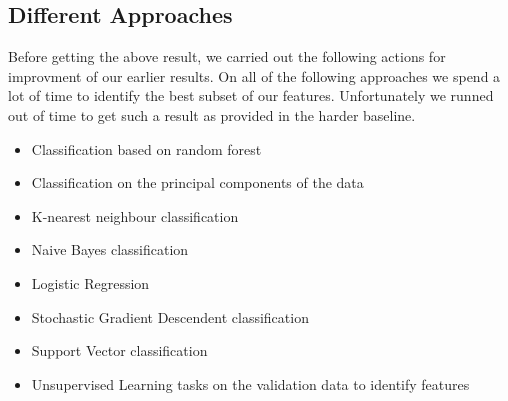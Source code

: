 \documentclass[a4paper, 11pt]{article}
\begin{document}
\subsection*{Different Approaches}
Before getting the above result, we carried out the following actions for improvment of our earlier results. On all of the following approaches we spend a lot of time to identify the best subset of our features. Unfortunately we runned out of time to get such a result as provided in the harder baseline.

\begin{itemize}
\item Classification based on random forest
\item Classification on the principal components of the data
\item K-nearest neighbour classification
\item Naive Bayes classification
\item Logistic Regression
\item Stochastic Gradient Descendent classification
\item Support Vector classification
\item Unsupervised Learning tasks on the validation data to identify features

\end{itemize}
\end{document}
